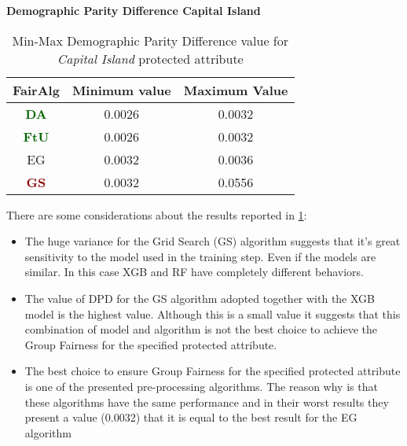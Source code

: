 \textbf{Demographic Parity Difference Capital Island}
\begin{table}
    \centering
    \begin{tabular}{|c|c|c|}
        \hline
        \textbf{FairAlg} & \textbf{Minimum value} & \textbf{Maximum Value} \\
        \hline
        \textcolor{darkgreen}{\textbf{DA}} & 0.0026 & 0.0032 \\
        \hline
        \textcolor{darkgreen}{\textbf{FtU}} & 0.0026 & 0.0032 \\
        \hline
        EG & 0.0032 & 0.0036 \\
        \hline
        \textcolor{darkred}{\textbf{GS}} & 0.0032 & 0.0556 \\
        \hline
    \end{tabular}
    \caption{Min-Max Demographic Parity Difference value for \emph{Capital Island} protected attribute}
    \label{tab:ci_dpd}
\end{table}

There are some considerations about the results reported in \cref{tab:ci_dpd}:

\begin{itemize}
    \item The huge variance for the Grid Search (GS) algorithm suggests that it's great sensitivity to the model used in the training step. Even if the models are similar. In this case XGB and RF have completely different behaviors.

    \item The value of DPD for the GS algorithm adopted together with the XGB model is the highest value. Although this is a small value it suggests that this combination of model and algorithm is not the best choice to achieve the Group Fairness for the specified protected attribute.

    \item The best choice to ensure Group Fairness for the specified protected attribute is one of the presented pre-processing algorithms. The reason why is that these algorithms have the same performance and in their worst results they present a value (0.0032) that it is equal to the best result for the EG algorithm
\end{itemize}

